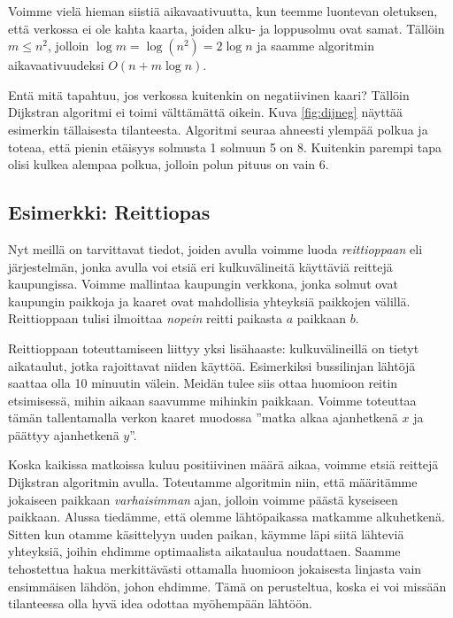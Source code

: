 Voimme vielä hieman siistiä aikavaativuutta, kun
teemme luontevan oletuksen,
että verkossa ei ole kahta kaarta, joiden alku- ja loppusolmu ovat samat.
Tällöin $m \le n^2$, jolloin $\log m = \log (n^2) = 2 \log n$
ja saamme algoritmin aikavaativuudeksi $O(n+m \log n)$.

Entä mitä tapahtuu, jos verkossa kuitenkin on negatiivinen kaari?
Tällöin Dijkstran algoritmi ei toimi välttämättä oikein.
Kuva \ref{fig:dijneg} näyttää esimerkin tällaisesta tilanteesta.
Algoritmi seuraa ahneesti ylempää polkua ja toteaa,
että pienin etäisyys solmusta 1 solmuun 5 on 8.
Kuitenkin parempi tapa olisi kulkea alempaa polkua,
jolloin polun pituus on vain 6.

\subsection{Esimerkki: Reittiopas}

Nyt meillä on tarvittavat tiedot,
joiden avulla voimme luoda \emph{reittioppaan}
eli järjestelmän, jonka avulla voi etsiä
eri kulkuvälineitä käyttäviä reittejä kaupungissa.
Voimme mallintaa kaupungin verkkona,
jonka solmut ovat kaupungin paikkoja ja kaaret
ovat mahdollisia yhteyksiä paikkojen välillä.
Reittioppaan tulisi ilmoittaa \emph{nopein} reitti
paikasta $a$ paikkaan $b$.

Reittioppaan toteuttamiseen liittyy yksi lisähaaste:
kulkuvälineillä on tietyt aikataulut,
jotka rajoittavat niiden käyttöä.
Esimerkiksi bussilinjan lähtöjä saattaa olla
10 minuutin välein.
Meidän tulee siis ottaa huomioon reitin etsimisessä,
mihin aikaan saavumme mihinkin paikkaan.
Voimme toteuttaa tämän tallentamalla verkon kaaret
muodossa ''matka alkaa ajanhetkenä $x$ ja
päättyy ajanhetkenä $y$''.

Koska kaikissa matkoissa kuluu positiivinen määrä aikaa,
voimme etsiä reittejä Dijkstran algoritmin avulla.
Toteutamme algoritmin niin,
että määritämme jokaiseen paikkaan \emph{varhaisimman}
ajan, jolloin voimme päästä kyseiseen paikkaan.
Alussa tiedämme, että olemme lähtöpaikassa
matkamme alkuhetkenä.
Sitten kun otamme käsittelyyn uuden paikan,
käymme läpi siitä lähteviä yhteyksiä,
joihin ehdimme optimaalista aikataulua noudattaen.
Saamme tehostettua hakua merkittävästi ottamalla
huomioon jokaisesta linjasta vain ensimmäisen lähdön,
johon ehdimme.
Tämä on perusteltua, koska ei voi missään tilanteessa
olla hyvä idea odottaa myöhempään lähtöön.

